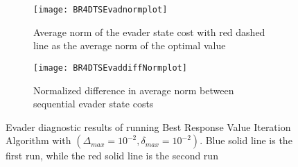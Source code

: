 \begin{figure}[h!]
\centering
\begin{subfigure}[t]{0.475\textwidth}
	\centering
	\texttt{[image: BR4DTSEvadnormplot]}
	\caption{Average norm of the evader state cost with red dashed line as the average norm of the optimal value}
	\label{BR4DTSEnp}
\end{subfigure}
\hfill
\begin{subfigure}[t]{0.475\textwidth}
	\centering
	\texttt{[image: BR4DTSEvaddiffNormplot]}
	\caption{Normalized difference in average norm between sequential evader state costs}
	\label{BR4DTSEdnp}
\end{subfigure}
\caption{Evader diagnostic results of running Best Response Value Iteration Algorithm with $(\Delta_{max} = 10^{-2},\delta_{max} = 10^{-2})$. Blue solid line is the first run, while the red solid line is the second run}
\label{BR4DTSEdiag}
\end{figure}

